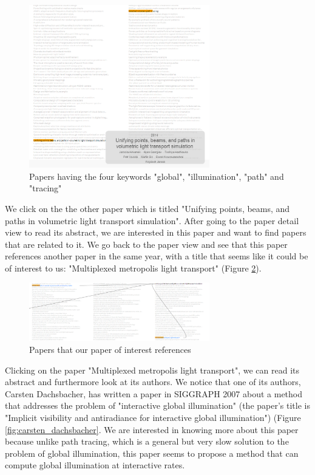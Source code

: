 \begin{figure}[ht]			
    \centering
    \includegraphics[width=0.7\textwidth]{global_illumination_path_tracing_papers.png}
    \caption{Papers having the four keywords "global", "illumination", "path" and "tracing"}
    \label{fig:global_illumination_path_tracing_papers}
\end{figure}

We click on the the other paper which is titled "Unifying points, beams, and paths in volumetric light transport simulation". After going to the paper detail view to read its abstract, we are interested in this paper and want to find papers that are related to it. We go back to the paper view and see that this paper references another paper in the same year, with a title that seems like it could be of interest to us: "Multiplexed metropolis light transport" (Figure \ref{fig:multiplexed_metropolis_light_transport_referenced}).

\begin{figure}[ht]			
    \centering
    \includegraphics[width=0.7\textwidth]{multiplexed_metropolis_light_trasnport_referenced.png}
    \caption{Papers that our paper of interest references}
    \label{fig:multiplexed_metropolis_light_transport_referenced}
\end{figure}

Clicking on the paper "Multiplexed metropolis light transport", we can read its abstract and furthermore look at its authors. We notice that one of its authors, Carsten Dachsbacher, has written a paper in SIGGRAPH 2007 about a method that addresses the problem of "interactive global illumination" (the paper's title is "Implicit visibility and antiradiance for interactive global illumination") (Figure \ref{fig:carsten_dachsbacher}. We are interested in knowing more about this paper because unlike path tracing, which is a general but very slow solution to the problem of global illumination, this paper seems to propose a method that can compute global illumination at interactive rates.


